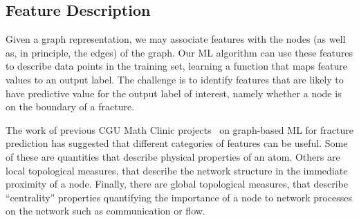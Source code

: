 
\subsection{Feature Description}
\label{subsec: Features}


Given a graph representation, we may associate features with the nodes (as well as, in principle, the edges) of the graph.  Our ML algorithm can use these features to describe data points in the training set, learning a function that maps feature values to an output label.  The challenge is to identify features that are likely to have predictive value for the output label of interest, namely whether a node is on the boundary of a fracture.


The work of previous CGU Math Clinic projects~\cite{valera2018machine,schwarzer2019learning} on graph-based ML for fracture prediction has suggested that different categories of features can be useful. Some of these are quantities that describe physical properties of an atom.  Others are local topological measures, that describe the network structure in the immediate proximity of a node. Finally, there are global topological measures, that describe ``centrality'' properties quantifying the importance of a node to network processes on the network such as communication or flow.

